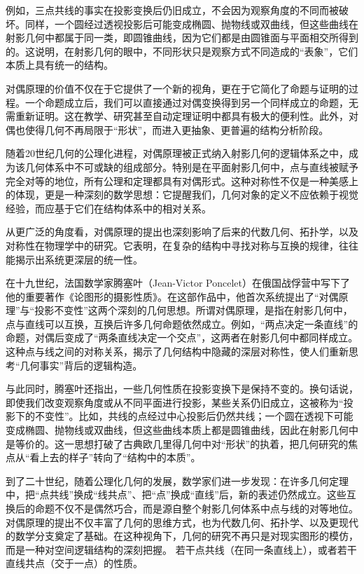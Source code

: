 例如，三点共线的事实在投影变换后仍旧成立，不会因为观察角度的不同而被破坏。同样，一个圆经过透视投影后可能变成椭圆、抛物线或双曲线，但这些曲线在射影几何中都属于同一类，即圆锥曲线，因为它们都是由圆锥面与平面相交所得到的。这说明，在射影几何的眼中，不同形状只是观察方式不同造成的“表象”，它们本质上具有统一的结构。

对偶原理的价值不仅在于它提供了一个新的视角，更在于它简化了命题与证明的过程。一个命题成立后，我们可以直接通过对偶变换得到另一个同样成立的命题，无需重新证明。这在教学、研究甚至自动定理证明中都具有极大的便利性。此外，对偶也使得几何不再局限于“形状”，而进入更抽象、更普遍的结构分析阶段。

随着20世纪几何的公理化进程，对偶原理被正式纳入射影几何的逻辑体系之中，成为该几何体系中不可或缺的组成部分。特别是在平面射影几何中，点与直线被赋予完全对等的地位，所有公理和定理都具有对偶形式。这种对称性不仅是一种美感上的体现，更是一种深刻的数学思想：它提醒我们，几何对象的定义不应依赖于视觉经验，而应基于它们在结构体系中的相对关系。

从更广泛的角度看，对偶原理的提出也深刻影响了后来的代数几何、拓扑学，以及对称性在物理学中的研究。它表明，在复杂的结构中寻找对称与互换的规律，往往能揭示出系统更深层的统一性。


在十九世纪，法国数学家腾塞叶（Jean-Victor Poncelet）在俄国战俘营中写下了他的重要著作《论图形的摄影性质》。在这部作品中，他首次系统提出了“对偶原理”与“投影不变性”这两个深刻的几何思想。所谓对偶原理，是指在射影几何中，点与直线可以互换，互换后许多几何命题依然成立。例如，“两点决定一条直线”的命题，对偶后变成了“两条直线决定一个交点”，这两者在射影几何中都同样成立。这种点与线之间的对称关系，揭示了几何结构中隐藏的深层对称性，使人们重新思考“几何事实”背后的逻辑构造。

与此同时，腾塞叶还指出，一些几何性质在投影变换下是保持不变的。换句话说，即使我们改变观察角度或从不同平面进行投影，某些关系仍旧成立，这被称为“投影下的不变性”。比如，共线的点经过中心投影后仍然共线；一个圆在透视下可能变成椭圆、抛物线或双曲线，但这些曲线本质上都是圆锥曲线，因此在射影几何中是等价的。这一思想打破了古典欧几里得几何中对“形状”的执着，把几何研究的焦点从“看上去的样子”转向了“结构中的本质”。

到了二十世纪，随着公理化几何的发展，数学家们进一步发现：在许多几何定理中，把“点共线”换成“线共点”、把“点”换成“直线”后，新的表述仍然成立。这些互换后的命题不仅不是偶然巧合，而是源自整个射影几何体系中点与线的对等地位。对偶原理的提出不仅丰富了几何的思维方式，也为代数几何、拓扑学、以及更现代的数学分支奠定了基础。在这种视角下，几何的研究不再只是对现实图形的模仿，而是一种对空间逻辑结构的深刻把握。
若干点共线（在同一条直线上），或者若干直线共点（交于一点）的性质。

